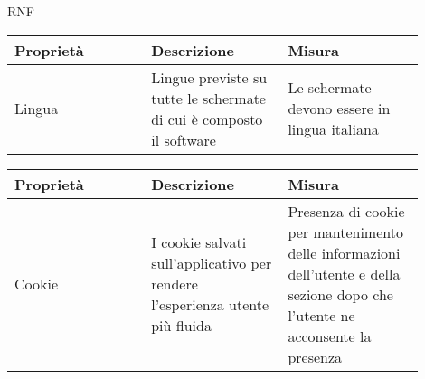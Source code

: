 \begin{listaPersonale}{RNF}
    \begin{tabular}{|p{0.3\linewidth}|p{0.3\linewidth}|p{0.3\linewidth}|}
        \hline
        \rowcolor{viola} \textbf{Proprietà} &
        \textbf{Descrizione}                &
        \textbf{Misura}                       \\
        \hline
        Lingua                              &
        Lingue previste su tutte le
        schermate di cui è composto
        il software                         &
        Le schermate devono
        essere in lingua italiana             \\
        \hline
    \end{tabular}

    \begin{tabular}{|p{0.3\linewidth}|p{0.3\linewidth}|p{0.3\linewidth}|}
        \hline
        \rowcolor{viola} \textbf{Proprietà} &
        \textbf{Descrizione}                &
        \textbf{Misura}                       \\
        \hline
        Cookie                              &
        I cookie salvati sull'applicativo
        per rendere l'esperienza utente
        più fluida                          &
        Presenza di cookie per mantenimento
        delle informazioni dell'utente e
        della sezione dopo che l'utente
        ne acconsente la presenza             \\
        \hline
    \end{tabular}

\end{listaPersonale}